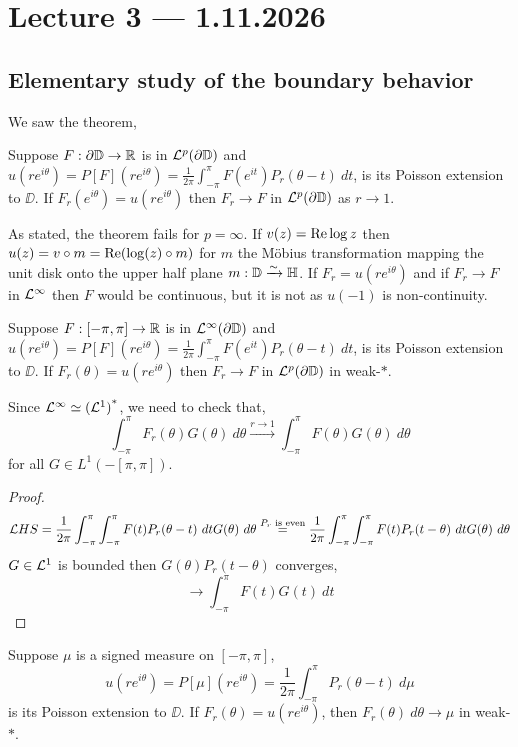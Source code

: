 \section{Lecture 3 --- 1.11.2026}
\subsection{Elementary study of the boundary behavior}
We saw the theorem,
\begin{theorem}
	Suppose $F : \partial \mathbb{D} \to \mathbb{R}$  is in $\mathcal{L}^p(\partial \mathbb{D})$ and $u(r e^{i \theta}) = P[F](r e^{i \theta}) = \frac{1}{2 \pi} \int_{-\pi}^{\pi} F(e^{i t}) P_r(\theta - t)\ dt$,
	is its Poisson extension to $\DD$. If $F_r(e^{i \theta}) = u(r e^{i \theta})$ then $F_r \to F$ in $\mathcal{L}^p(\partial \mathbb{D})$ as $r \to 1$.
\end{theorem}
\begin{remark}
	As stated, the theorem fails for $p = \infty$.
	If $v(z) = \operatorname{Re} \log z$ then $u(z) = v \circ m = \operatorname{Re}(\log(z) \circ m)$ for $m$ the Möbius transformation mapping the unit disk onto the upper half plane $m : \mathbb{D} \xrightarrow{\sim} \mathbb{H}$.
	If $F_r = u(r e^{i \theta})$ and if $F_r \to F$ in $\mathcal{L}^\infty$ then $F$ would be continuous, but it is not as $u(-1)$ is non-continuity.
\end{remark}
\begin{theorem}
	Suppose $F : [-\pi, \pi] \to \mathbb{R}$  is in $\mathcal{L}^\infty(\partial \mathbb{D})$ and $u(r e^{i \theta}) = P[F](r e^{i \theta}) = \frac{1}{2 \pi} \int_{-\pi}^{\pi} F(e^{i t}) P_r(\theta - t)\ dt$,
	is its Poisson extension to $\DD$. If $F_r(\theta) = u(r e^{i \theta})$ then $F_r \to F$ in $\mathcal{L}^p(\partial \mathbb{D})$ in weak-$*$.
\end{theorem}
Since $\mathcal{L}^\infty \simeq {(\mathcal{L}^1)}^*$, we need to check that,
\[
	\int_{-\pi}^{\pi} F_r(\theta) G(\theta)\ d \theta
 	\xrightarrow{r \to 1} \int_{-\pi}^{\pi} F(\theta) G(\theta)\ d \theta
\]
for all $G \in L^1(-[\pi, \pi])$.
\begin{proof}
	\[
		\Ll HS
		= \frac{1}{2 \pi} \int_{-\pi}^{\pi} \int_{-\pi}^{\pi} F(t) P_r(\theta - t)\ d t G(\theta)\ d \theta
		\overset{P_r \text{ is even}}{=}  \frac{1}{2 \pi} \int_{-\pi}^{\pi} \int_{-\pi}^{\pi} F(t) P_r(t - \theta)\ d t G(\theta)\ d \theta
	\]
	$G \in \mathcal{L}^1$ is bounded then $G(\theta) P_r(t - \theta)$ converges,
	\[
		\to
		\int_{-\pi}^{\pi} F(t) G(t)\ d t
	\]
\end{proof}
\begin{theorem}
	Suppose $\mu$ is a signed measure on $[-\pi, \pi]$,
	\[
		u(r e^{i \theta})
		= P[\mu](r e^{i \theta})
		= \frac{1}{2 \pi} \int_{-\pi}^{\pi} P_r(\theta - t)\ d \mu
	\]
	is its Poisson extension to $\DD$.
	If $F_r(\theta) = u(r e^{i \theta})$, then $F_r(\theta)\ d \theta \to \mu$ in weak-$*$.
\end{theorem}
